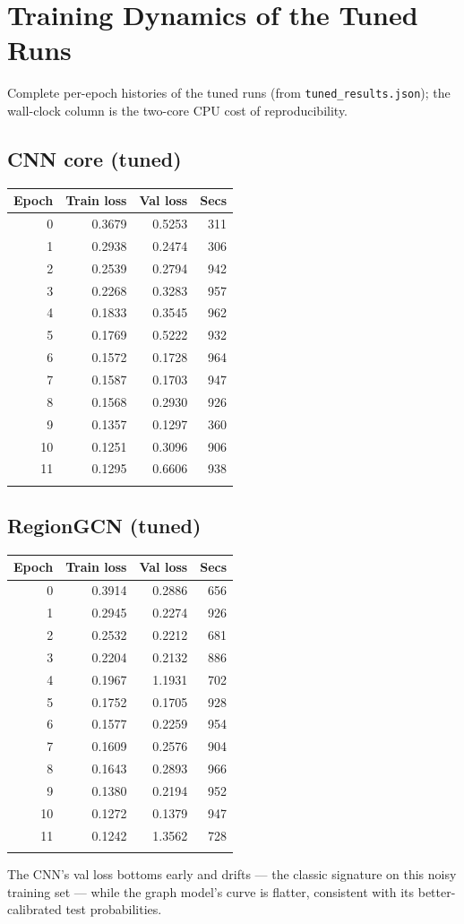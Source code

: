 
\section{Training Dynamics of the Tuned Runs}
\label{sec:tuneddyn}
Complete per-epoch histories of the tuned runs (from
\texttt{tuned\_results.json}); the wall-clock column is the two-core
CPU cost of reproducibility.
\subsection{CNN core (tuned)}\begin{center}\begin{tabular}{rrrr}\hline Epoch & Train loss & Val loss & Secs \\\hline
0 & 0.3679 & 0.5253 & 311 \\
1 & 0.2938 & 0.2474 & 306 \\
2 & 0.2539 & 0.2794 & 942 \\
3 & 0.2268 & 0.3283 & 957 \\
4 & 0.1833 & 0.3545 & 962 \\
5 & 0.1769 & 0.5222 & 932 \\
6 & 0.1572 & 0.1728 & 964 \\
7 & 0.1587 & 0.1703 & 947 \\
8 & 0.1568 & 0.2930 & 926 \\
9 & 0.1357 & 0.1297 & 360 \\
10 & 0.1251 & 0.3096 & 906 \\
11 & 0.1295 & 0.6606 & 938 \\
\\\hline\end{tabular}\end{center}
\subsection{RegionGCN (tuned)}\begin{center}\begin{tabular}{rrrr}\hline Epoch & Train loss & Val loss & Secs \\\hline
0 & 0.3914 & 0.2886 & 656 \\
1 & 0.2945 & 0.2274 & 926 \\
2 & 0.2532 & 0.2212 & 681 \\
3 & 0.2204 & 0.2132 & 886 \\
4 & 0.1967 & 1.1931 & 702 \\
5 & 0.1752 & 0.1705 & 928 \\
6 & 0.1577 & 0.2259 & 954 \\
7 & 0.1609 & 0.2576 & 904 \\
8 & 0.1643 & 0.2893 & 966 \\
9 & 0.1380 & 0.2194 & 952 \\
10 & 0.1272 & 0.1379 & 947 \\
11 & 0.1242 & 1.3562 & 728 \\
\\\hline\end{tabular}\end{center}
The CNN's val loss bottoms early and drifts --- the classic signature on
this noisy training set --- while the graph model's curve is flatter,
consistent with its better-calibrated test probabilities.
